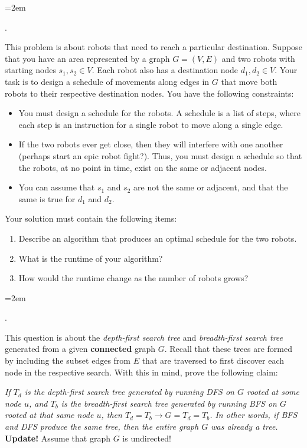 \documentclass[12pt]{article}
\newcounter{quesnum}
\newcommand{\question}[2][??]{
\begin{list}{\labelitemi}{\leftmargin=2em}
\item [\arabic{quesnum}.] {#2}
\end{list}
\addtocounter{quesnum}{1}
}
\newcommand{\answer}[2][??]{ 
\ifthenelse{\boolean{solution}}{
\color{red} #2 \color{black}}
{\vspace*{#1}}
}
\begin{document}
\question[1]{
This problem is about robots that need to reach a particular destination. Suppose that you have an area represented by a graph $G = (V,E)$ and two robots with starting nodes $s_1, s_2 \in V$. Each robot also has a destination node $d_1,d_2 \in V$. Your task is to design a schedule of movements along edges in $G$ that move both robots to their respective destination nodes. You have the following constraints:

\begin{itemize}
\item You must design a schedule for the robots. A schedule is a list of steps, where each step is an instruction for a single robot to move along a single edge.
\item If the two robots ever get close, then they will interfere with one another (perhaps start an epic robot fight?). Thus, you must design a schedule so that the robots, at no point in time, exist on the same or adjacent nodes.
\item You can assume that $s_1$ and $s_2$ are not the same or adjacent, and that the same is true for $d_1$ and $d_2$.
\end{itemize}

Your solution must contain the following items:

\begin{enumerate}
\item Describe an algorithm that produces an optimal schedule for the two robots.
\item What is the runtime of your algorithm?
\item How would the runtime change as the number of robots grows?
\end{enumerate}
}

\answer[0.25in]{...}
















\iffalse


\question[3]{
This question is about the \emph{depth-first search tree} and \emph{breadth-first search tree} generated from a given \textbf{connected} graph $G$. Recall that these trees are formed by including the subset edges from $E$ that are traversed to first discover each node in the respective search. With this in mind, prove the following claim:

\emph{If $T_d$ is the depth-first search tree generated by running DFS on $G$ rooted at some node $u$, and $T_b$ is the breadth-first search tree generated by running BFS on $G$ rooted at that same node $u$, then $T_d=T_b \to G=T_d=T_b$. In other words, if BFS and DFS produce the same tree, then the entire graph $G$ was already a tree.}
\\{\bf Update!}  Assume that graph $G$ is undirected!
}
\end{document}

